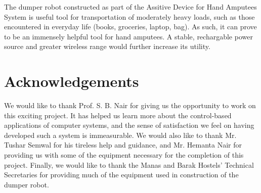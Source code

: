 \documentclass[a4paper]{article}
\begin{document}
The dumper robot constructed as part of the Assitive Device for Hand Amputees System is useful tool for transportation of moderately heavy loads, such as those encountered in everyday life (books, groceries, laptop, bag). As such, it can prove to be an immensely helpful tool for hand amputees. A stable, rechargable power source and greater wireless range would further increase its utility.

\section{Acknowledgements}

We would like to thank Prof. S. B. Nair for giving us the opportunity to work on this exciting project. It has helped us learn more about the control-based applications of computer systems, and the sense of satisfaction we feel on having developed such a system is immeasurable. We would also like to thank Mr. Tushar Semwal for his tireless help and guidance, and Mr. Hemanta Nair for providing us with some of the equipment necessary for the completion of this project. Finally, we would like to thank the Manas and Barak Hostels' Technical Secretaries for providing much of the equipment used in construction of the dumper robot.
\end{document}
